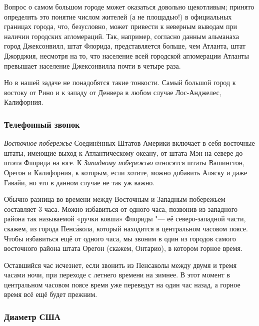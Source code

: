 \documentclass[twoside]{book}
\begin{document}
Вопрос о самом большом городе может оказаться довольно щекотливым; 
принято определять это понятие числом жителей (а не площадью!) в официальных границах города, что, безусловно, может привести к неверным выводам
при наличии городских агломераций.
Так, например, согласно данным альманаха город Джексонвилл, штат Флорида, представляется больше, чем Атланта, штат Джорджия, несмотря на то, что население всей городской агломерации Атланты превышает население Джексонвилла почти в четыре раза.

\medskip

Но в нашей задаче не понадобятся такие тонкости.
Самый большой город к востоку от Рино и к западу от Денвера в любом случае Лос-Анджелес, Калифорния.
\heart

\subsubsection*{Телефонный звонок}%

\emph{Восточное побережье} Соединённых Штатов Америки включает в себя восточные штаты, имеющие выход к Атлантическому океану, от штата Мэн на севере до штата Флорида на юге.
К \emph{Западному побережью} относятся штаты Вашингтон, Орегон и Калифорния,
к которым, если хотите, можно добавить Аляску и даже Гавайи, но это в данном случае не так уж важно. %

Обычно разница во времени между Восточным и Западным побережьем составляет 3 часа.
Можно избавиться от одного часа, позвонив из западного района так называемой «ручки ковша» Флориды "--- её северо-западной части, %
скажем, из города Пенс\'{а}кола, который находится в центральном часовом поясе.
Чтобы избавиться ещё от одного часа, мы звоним в один из городов самого восточного района штата Орегон (скажем, Онтарио), в котором горное время.

Оставшийся час исчезнет, если звонить из Пенсаколы между двумя и тремя часами ночи, при переходе с летнего времени на зимнее.
В этот момент в центральном часовом поясе время уже переведут на один час назад, а горное время всё ещё будет прежним.\heart 

       
                                  
\subsubsection*{Диаметр США}%
\end{document}
